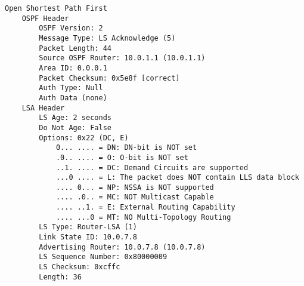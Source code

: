 \begin{lstlisting}
Open Shortest Path First
    OSPF Header
        OSPF Version: 2
        Message Type: LS Acknowledge (5)
        Packet Length: 44
        Source OSPF Router: 10.0.1.1 (10.0.1.1)
        Area ID: 0.0.0.1
        Packet Checksum: 0x5e8f [correct]
        Auth Type: Null
        Auth Data (none)
    LSA Header
        LS Age: 2 seconds
        Do Not Age: False
        Options: 0x22 (DC, E)
            0... .... = DN: DN-bit is NOT set
            .0.. .... = O: O-bit is NOT set
            ..1. .... = DC: Demand Circuits are supported
            ...0 .... = L: The packet does NOT contain LLS data block
            .... 0... = NP: NSSA is NOT supported
            .... .0.. = MC: NOT Multicast Capable
            .... ..1. = E: External Routing Capability
            .... ...0 = MT: NO Multi-Topology Routing
        LS Type: Router-LSA (1)
        Link State ID: 10.0.7.8
        Advertising Router: 10.0.7.8 (10.0.7.8)
        LS Sequence Number: 0x80000009
        LS Checksum: 0xcffc
        Length: 36
\end{lstlisting}
